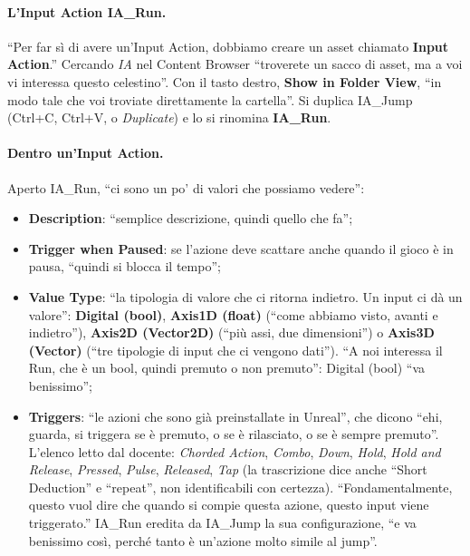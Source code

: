 \paragraph{L'Input Action IA\_Run.} ``Per far sì di avere un'Input Action, dobbiamo creare
un asset chiamato \textbf{Input Action}.'' Cercando \emph{IA} nel Content Browser ``troverete
un sacco di asset, ma a voi vi interessa questo celestino''. Con il tasto destro,
\textbf{Show in Folder View}, ``in modo tale che voi troviate direttamente la cartella''.
Si duplica IA\_Jump (Ctrl+C, Ctrl+V, o \emph{Duplicate}) e lo si rinomina
\textbf{IA\_Run}.

\paragraph{Dentro un'Input Action.} Aperto IA\_Run, ``ci sono un po' di valori che
possiamo vedere'':
\begin{itemize}
  \item \textbf{Description}: ``semplice descrizione, quindi quello che fa'';
  \item \textbf{Trigger when Paused}: se l'azione deve scattare anche quando il gioco è in
        pausa, ``quindi si blocca il tempo'';
  \item \textbf{Value Type}: ``la tipologia di valore che ci ritorna indietro. Un input ci
        dà un valore'': \textbf{Digital (bool)}, \textbf{Axis1D (float)} (``come abbiamo
        visto, avanti e indietro''), \textbf{Axis2D (Vector2D)} (``più assi, due
        dimensioni'') o \textbf{Axis3D (Vector)} (``tre tipologie di input che ci vengono
        dati''). ``A noi interessa il Run, che è un bool, quindi premuto o non premuto'':
        Digital (bool) ``va benissimo'';
  \item \textbf{Triggers}: ``le azioni che sono già preinstallate in Unreal'', che dicono
        ``ehi, guarda, si triggera se è premuto, o se è rilasciato, o se è sempre
        premuto''. L'elenco letto dal docente: \emph{Chorded Action}, \emph{Combo},
        \emph{Down}, \emph{Hold}, \emph{Hold and Release}, \emph{Pressed}, \emph{Pulse},
        \emph{Released}, \emph{Tap} (la trascrizione dice anche ``Short Deduction'' e
        ``repeat'', non identificabili con certezza). ``Fondamentalmente, questo vuol
        dire che quando si compie questa azione, questo input viene triggerato.'' IA\_Run
        eredita da IA\_Jump la sua configurazione, ``e va benissimo così, perché tanto è
        un'azione molto simile al jump''.
\end{itemize}

